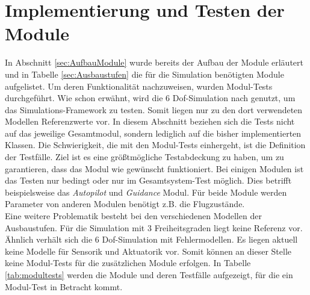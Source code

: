 \section{Implementierung und Testen der Module}
In Abschnitt \ref{sec:AufbauModule} wurde bereits der Aufbau der Module erläutert und in Tabelle \ref{sec:Ausbaustufen} die für die Simulation benötigten Module aufgelistet. Um deren Funktionalität nachzuweisen, wurden Modul-Tests durchgeführt. Wie schon erwähnt, wird die 6 Dof-Simulation nach \cite{Olucak.15.02.2017} genutzt, um das Simulations-Framework zu testen. Somit liegen nur zu den dort verwendeten Modellen Referenzwerte vor. In diesem Abschnitt beziehen sich die Tests nicht auf das jeweilige Gesamtmodul, sondern lediglich auf die bisher implementierten Klassen.
Die Schwierigkeit, die mit den Modul-Tests einhergeht, ist die Definition der Testfälle. Ziel ist es eine größtmögliche Testabdeckung zu haben, um zu garantieren, dass das Modul wie gewünscht funktioniert. Bei einigen Modulen ist das Testen nur bedingt oder  nur im Gesamtsystem-Test möglich. Dies betrifft beispielsweise das \textit{Autopilot} und \textit{Guidance} Modul. Für beide Module werden Parameter von anderen Modulen benötigt z.B. die Flugzustände. \\Eine weitere Problematik besteht bei den verschiedenen  Modellen der Ausbaustufen.  Für die Simulation mit 3 Freiheitsgraden liegt keine Referenz vor. Ähnlich verhält sich die 6 Dof-Simulation mit Fehlermodellen. Es liegen aktuell keine Modelle für Sensorik und Aktuatorik vor. Somit können an dieser Stelle keine Modul-Tests für die zusätzlichen Module erfolgen.
In Tabelle \ref{tab:modultests} werden die Module  und deren Testfälle aufgezeigt, für die ein Modul-Test in Betracht kommt.\\
